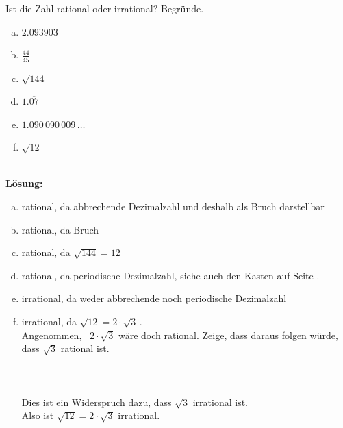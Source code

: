 \begin{example}
	Ist die Zahl rational oder irrational? Begründe.\\
	\begin{minipage}[t]{.3\linewidth}
		\begin{enumerate}[a)]
			\item $2.093903$
			\item $\frac{44}{45}$
		\end{enumerate}
	\end{minipage}
	\hfill
	\begin{minipage}[t]{.3\linewidth}
		\begin{enumerate}[a)]
		\setcounter{enumi}{2}
			\item $\sqrt{144}$
			\item $1.\overline{07}$
		\end{enumerate}
	\end{minipage}
	\hfill
	\begin{minipage}[t]{.3\linewidth}
		\begin{enumerate}[a)]
		\setcounter{enumi}{4}
			\item $1.090\,090\,009\,\ldots$
			\item $\sqrt{12}$
		\end{enumerate}
	\end{minipage}
	\vspace{.5cm}~\\
	{\bfseries Lösung:}
	\begin{enumerate}[a)]
        \setlength\itemsep{0pt}
        \item rational, da abbrechende Dezimalzahl und deshalb als Bruch darstellbar
        \item rational, da Bruch
        \item rational, da $\sqrt{144} = 12$
        \item rational, da periodische Dezimalzahl, siehe auch den Kasten auf Seite \pageref{law:periodicIsRational}.
        \item irrational, da weder abbrechende noch periodische Dezimalzahl
        \item irrational, da $\sqrt{12} = 2\cdot\sqrt{3}$\,.\\
        Angenommen, ~$2\cdot \sqrt{3}$ wäre doch rational. Zeige, dass daraus folgen würde, dass $\sqrt{3}$ rational ist.\\~\\
        \\~\\
        Dies ist ein Widerspruch dazu, dass $\sqrt{3}$ irrational ist.\\
        Also ist $\sqrt{12} = 2\cdot \sqrt{3}$ irrational.
    \end{enumerate}
\end{example}

